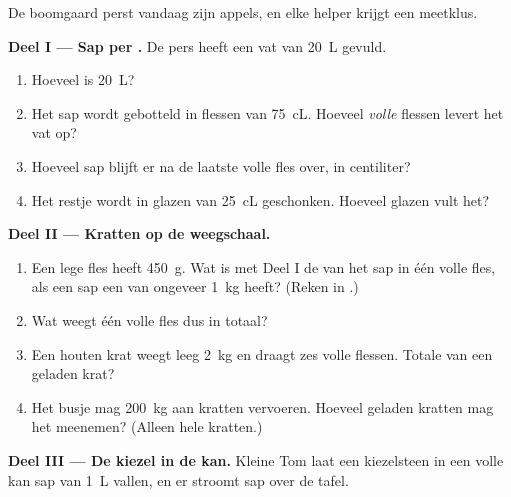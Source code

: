 \begin{problem}\label{pb:g6:mass-and-volume:1}
De boomgaard perst vandaag zijn appels, en elke helper krijgt een
meetklus.

\medskip\noindent\textbf{Deel I --- Sap per .}
De pers heeft een vat van \qty{20}{L} gevuld.
\begin{enumerate}
  \item Hoeveel  is \qty{20}{L}?
  \item Het sap wordt gebotteld in flessen van \qty{75}{cL}. Hoeveel
        \emph{volle} flessen levert het vat op?
  \item Hoeveel sap blijft er na de laatste volle fles over, in
        centiliter?
  \item Het restje wordt in glazen van \qty{25}{cL} geschonken.
        Hoeveel glazen vult het?
\end{enumerate}

\medskip\noindent\textbf{Deel II --- Kratten op de weegschaal.}
\begin{enumerate}[resume]
  \item Een lege fles heeft  \qty{450}{g}. Wat is met Deel I de
         van het sap in één volle fles, als een  sap een
         van ongeveer \qty{1}{kg} heeft? (Reken in .)
  \item Wat weegt één volle fles dus in totaal?
  \item Een houten krat weegt leeg \qty{2}{kg} en draagt zes volle
        flessen. Totale  van een geladen krat?
  \item Het busje mag \qty{200}{kg} aan kratten vervoeren. Hoeveel
        geladen kratten mag het meenemen? (Alleen hele kratten.)
\end{enumerate}

\medskip\noindent\textbf{Deel III --- De kiezel in de kan.}
Kleine Tom laat een kiezelsteen in een volle kan sap van \qty{1}{L}
vallen, en er stroomt sap over de tafel.


\end{problem}
